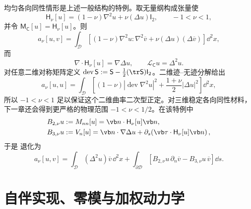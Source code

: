 均匀各向同性情形是上述一般结构的特例。取无量纲构成张量使
\begin{equation}
 \mathsf H_\nu[u]
 =(1-\nu)\nabla^2u+\nu(\Delta u)\mathsf I_2,
 \qquad -1<\nu<1,
 \label{eq:phys-cont-biharmonic-Hnu}
\end{equation}
并令 \(\mathsf M_{\mathsf C}[u]=\mathsf H_\nu[u]\)。则
\begin{equation}
 a_\nu[u,v]
 =\int_\mathcal D\left[(1-\nu)\nabla^2u:\nabla^2\overline v
 +\nu(\Delta u)(\Delta\overline v)\right]\dd^2x,
 \label{eq:phys-cont-bending-form}
\end{equation}
而
\[
 \nabla\cdot\mathsf H_\nu[u]=\nabla\Delta u,
 \qquad
 \mathcal L_{\mathsf C}u=\Delta^2u.
\]
对任意二维对称矩阵定义 \(\operatorname{dev}\mathsf S:=\mathsf S-\tfrac12(\tr\mathsf S)\mathsf I_2\)。二维迹--无迹分解给出
\[
 a_\nu[u,u]
 =\int_\mathcal D\left[(1-\nu)|\operatorname{dev}\nabla^2u|^2
 +\frac{1+\nu}{2}|\Delta u|^2\right]\dd^2x,
\]
所以 \(-1<\nu<1\) 足以保证这个二维曲率二次型正定。对三维稳定各向同性材料，下一章还会得到更严格的物理范围 \(-1<\nu<1/2\)。在该特例中
\begin{align}
 B_{2,\nu}u&:=M_{nn}[u]=\vb n\cdot\mathsf H_\nu[u]\vb n,
 \label{eq:phys-cont-biharmonic-B2}\\
 B_{3,\nu}u&:=V_n[u]
 =\vb n\cdot\nabla\Delta u
 +\partial_s\!\left(\vb\tau\cdot\mathsf H_\nu[u]\vb n\right),
 \label{eq:phys-cont-biharmonic-B3}
\end{align}
于是 退化为
\begin{equation}
 a_\nu[u,v]
 =\int_\mathcal D(\Delta^2u)\overline v\,\dd^2x
 +\int_{\partial\mathcal D}
 \left[B_{2,\nu}u\,\partial_n\overline v-B_{3,\nu}u\,\overline v\right]\dd s.
 \label{eq:phys-cont-biharmonic-green-first}
\end{equation}



\section{自伴实现、零模与加权动力学}

